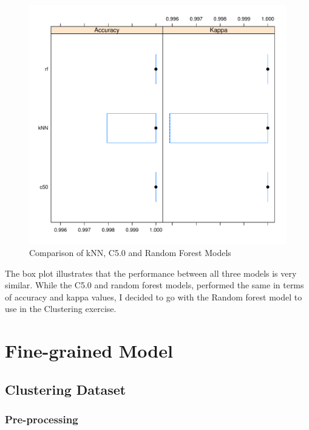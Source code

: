 \documentclass[10pt  ,usenames, dvipsnames]{article}\usepackage[]{graphicx}\usepackage[]{color}
\newenvironment{knitrout}{}{} %
\begin{document}
\begin{figure}[H]
\begin{center}
\begin{knitrout}
\color{fgcolor}
\includegraphics[width=0.75\linewidth]{figure/unnamed-chunk-51-1} 

\end{knitrout}
\caption {Comparison of kNN, C5.0 and Random Forest Models}
\label{fig5}
\end {center}
\end {figure}


The box plot illustrates that the performance between all three models is very similar. 
While the C5.0 and random forest models, performed the same in terms of accuracy and kappa values, I decided to go with the Random forest model to use in the Clustering exercise.



\clearpage



\section{Fine-grained Model}


\subsection{Clustering Dataset}

\subsubsection{Pre-processing}
\end{document}
